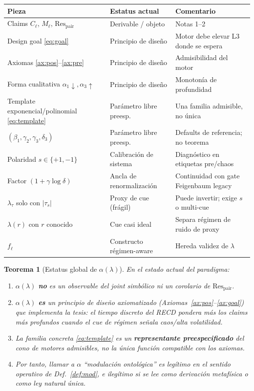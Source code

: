 \documentclass[11pt,a4paper]{article}
\theoremstyle{definition}
\theoremstyle{plain}
\newtheorem{theorem}{Teorema}[section]
\theoremstyle{remark}
\newcommand{\Res}{\mathrm{Res}}
\begin{document}
\begin{center}
\begin{tabular}{@{}p{}p{}p{}@{}}
\toprule
Pieza & Estatus actual & Comentario \\
\midrule
Claims $C_\ell$, $M_\ell$, $\Res_{\mathrm{pair}}$ &
Derivable / objeto & Notas 1--2 \\
Design goal \eqref{eq:goal} &
Principio de dise\~no & Motor debe elevar L3 donde se espera \\
Axiomas \ref{ax:pos}--\ref{ax:pre} &
Principio de dise\~no & Admisibilidad del motor \\
Forma cualitativa $\alpha_1\!\downarrow,\alpha_3\!\uparrow$ &
Principio de dise\~no & Monoton\'ia de profundidad \\
Template exponencial/polinomial \eqref{eq:template} &
Par\'ametro libre preesp. & Una familia admisible, no \'unica \\
$(\beta_1,\gamma_2,\gamma_3,\delta_3)$ &
Par\'ametro libre preesp. & Defaults de referencia; no teorema \\
Polaridad $s\in\{+1,-1\}$ &
Calibración de sistema & Diagn\'ostico en etiquetas pre/chaos \\
Factor $(1+\gamma\log\delta)$ &
Ancla de renormalización & Continuidad con gate Feigenbaum legacy \\
$\lambda_\tau$ solo con $|\tau_s|$ &
Proxy de cue (fr\'agil) & Puede invertir; exige $s$ o multi-cue \\
$\lambda(r)$ con $r$ conocido &
Cue casi ideal & Separa r\'egimen de ruido de proxy \\
$f_\ell$ &
Constructo r\'egimen-aware & Hereda validez de $\lambda$ \\
\bottomrule
\end{tabular}
\end{center}

\begin{theorem}[Estatus global de $\alpha(\lambda)$]
\label{thm:status}
En el estado actual del paradigma:
\begin{enumerate}[label=(\roman*)]
  \item $\alpha(\lambda)$ \textbf{no} es un observable del joint
  simb\'olico ni un corolario de $\Res_{\mathrm{pair}}$.
  \item $\alpha(\lambda)$ \textbf{es} un \emph{principio de dise\~no
  axiomatizado} (Axiomas~\ref{ax:pos}--\ref{ax:goal}) que implementa la
  tesis: \emph{el tiempo discreto del RECD pondera m\'as los claims m\'as
  profundos cuando el cue de r\'egimen se\~nala caos/alta volatilidad}.
  \item La \emph{familia concreta} \eqref{eq:template} es un
  \textbf{representante preespecificado} del cono de motores admisibles,
  no la \'unica funci\'on compatible con los axiomas.
  \item Por tanto, llamar a $\alpha$ ``modulación ontológica'' es
  leg\'itimo en el sentido operativo de Def.~\ref{def:mod}, e ileg\'itimo
  si se lee como derivación metaf\'isica o como ley natural \'unica.
\end{enumerate}
\end{theorem}
\end{document}
